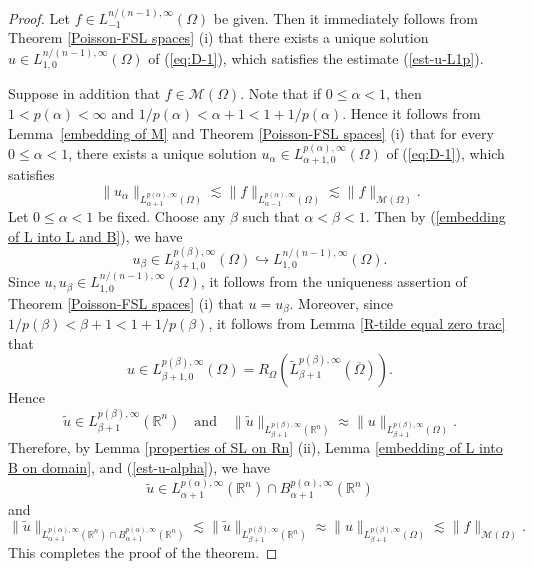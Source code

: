 \documentclass[reqno,centertags,11pt]{amsart}
\theoremstyle{definition}
\numberwithin{thm}{section}
\numberwithin{equation}{section}
\newcommand{\R}{{\mathbb{R}}}
\begin{document}
\begin{proof}  Let $ f\in L_{-1}^{n/(n-1),\infty} (\Omega )$ be given. Then it immediately  follows from   Theorem \ref{Poisson-FSL spaces} (i) that  there exists   a unique solution  $u\in L_{1, 0}^{n/(n-1),\infty}(\Omega )$  of (\ref{eq:D-1}), which satisfies the estimate  (\ref{est-u-L1p}).

Suppose in addition that  $ f\in \mathcal{M}  (\Omega )$.
Note that if $0 \le    \alpha <1$, then  $1< p(\alpha)<\infty$ and $1/p(\alpha) < \alpha +1 < 1+1/p(\alpha)$. Hence it follows from Lemma~\ref{embedding of M} and Theorem \ref{Poisson-FSL spaces} (i) that for every  $0 \le  \alpha <1$, there exists a unique solution $u_\alpha \in L_{\alpha+1,0}^{p(\alpha) ,\infty}(\Omega )$ of (\ref{eq:D-1}), which satisfies
\begin{equation}\label{est-u-alpha}
\|u_\alpha \|_{L_{\alpha+1}^{p(\alpha),\infty}(\Omega )} \lesssim \|f \|_{L_{\alpha-1}^{p(\alpha),\infty}(\Omega )} \lesssim  \|f \|_{\mathcal{M}  (\Omega )} .
\end{equation}
Let   $0 \le   \alpha <1$ be fixed. Choose any $\beta$ such that
 $  \alpha   <  \beta  < 1$. Then by (\ref{embedding of L into L and B}), we have
\[
u_\beta \in L_{\beta+1,0}^{p(\beta),\infty}(\Omega )\hookrightarrow L_{1,0}^{n/(n-1),\infty}(\Omega )   .
\]
Since  $u   , u_\beta     \in L_{1,0}^{n/(n-1),\infty}(\Omega )$,
it follows from the uniqueness assertion of Theorem \ref{Poisson-FSL spaces} (i) that $u  =  u_\beta  $. Moreover, since $1/p(\beta)< \beta+1 < 1+1/
p(\beta)$,   it follows from Lemma \ref{R-tilde equal zero trac} that
$$
u  \in L_{\beta+1,0}^{p(\beta),\infty}(\Omega ) =  R_\Omega  ( \widetilde{L}_{\beta+1}^{p(\beta),\infty}(\overline{\Omega} )).
$$
Hence
$$
\widetilde{u}  \in L_{\beta+1}^{p(\beta) ,\infty}(\R^n  )
\quad\mbox{and}\quad \|\widetilde{u}  \|_{L_{\beta+1}^{p(\beta) ,\infty}(\R^n  )} \approx \|u   \|_{L_{\beta+1}^{p(\beta),\infty}(\Omega ) }.
$$
Therefore, by Lemma \ref{properties of SL on Rn} (ii),  Lemma \ref{embedding of L into B on domain}, and (\ref{est-u-alpha}), we have
\[
\widetilde{u}  \in L_{\alpha+1}^{p(\alpha) ,\infty}(\R^n  )\cap B_{\alpha+1}^{p(\alpha) ,\infty}(\R^n  )
\]
and
\[
 \|\widetilde{u}  \|_{L_{\alpha+1}^{p(\alpha),\infty}(\R^n )\cap B_{\alpha+1}^{p(\alpha),\infty}(\R^n )} \lesssim \|\widetilde{u}  \|_{L_{\beta+1}^{p(\beta) ,\infty}(\R^n  )} \approx \|u  \|_{L_{\beta+1}^{p(\beta),\infty}(\Omega )} \lesssim    \|f \|_{\mathcal{M}  (\Omega )}.
\]
This completes the proof of the theorem.
\end{proof}
\end{document}

